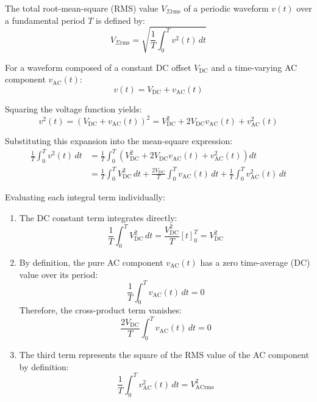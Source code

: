 The total root-mean-square (RMS) value $V_{\Sigma \text{rms}}$ of a periodic waveform $v(t)$ over a fundamental period $T$ is defined by:
\begin{equation*}
    V_{\Sigma \text{rms}} = \sqrt{\frac{1}{T} \int_{0}^{T} v^2(t) \, dt}
\end{equation*}

For a waveform composed of a constant DC offset $V_{\text{DC}}$ and a time-varying AC component $v_{\text{AC}}(t)$:
\begin{equation*}
    v(t) = V_{\text{DC}} + v_{\text{AC}}(t)
\end{equation*}

Squaring the voltage function yields:
\begin{equation*}
    v^2(t) = \left( V_{\text{DC}} + v_{\text{AC}}(t) \right)^2 = V_{\text{DC}}^2 + 2 V_{\text{DC}} v_{\text{AC}}(t) + v_{\text{AC}}^2(t)
\end{equation*}

Substituting this expansion into the mean-square expression:
\begin{align*}
    \frac{1}{T} \int_{0}^{T} v^2(t) \, dt &= \frac{1}{T} \int_{0}^{T} \left( V_{\text{DC}}^2 + 2 V_{\text{DC}} v_{\text{AC}}(t) + v_{\text{AC}}^2(t) \right) dt \\
    &= \frac{1}{T} \int_{0}^{T} V_{\text{DC}}^2 \, dt + \frac{2 V_{\text{DC}}}{T} \int_{0}^{T} v_{\text{AC}}(t) \, dt + \frac{1}{T} \int_{0}^{T} v_{\text{AC}}^2(t) \, dt
\end{align*}

Evaluating each integral term individually:
\begin{enumerate}
    \item The DC constant term integrates directly:
    \begin{equation*}
        \frac{1}{T} \int_{0}^{T} V_{\text{DC}}^2 \, dt = \frac{V_{\text{DC}}^2}{T} [t]_{0}^{T} = V_{\text{DC}}^2
    \end{equation*}

    \item By definition, the pure AC component $v_{\text{AC}}(t)$ has a zero time-average (DC) value over its period:
    \begin{equation*}
        \frac{1}{T} \int_{0}^{T} v_{\text{AC}}(t) \, dt = 0
    \end{equation*}
    Therefore, the cross-product term vanishes:
    \begin{equation*}
        \frac{2 V_{\text{DC}}}{T} \int_{0}^{T} v_{\text{AC}}(t) \, dt = 0
    \end{equation*}

    \item The third term represents the square of the RMS value of the AC component by definition:
    \begin{equation*}
        \frac{1}{T} \int_{0}^{T} v_{\text{AC}}^2(t) \, dt = V_{\text{ACrms}}^2
    \end{equation*}
\end{enumerate}

